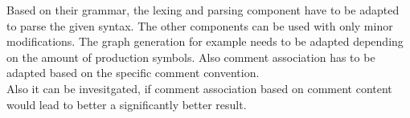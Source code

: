 Based on their grammar, the lexing and parsing component have to be adapted to parse the given syntax.
The other components can be used with only minor modifications.
The graph generation for example needs to be adapted depending on the amount of production symbols.
Also comment association has to be adapted based on the specific comment convention.\\
Also it can be invesitgated, if comment association based on comment content would lead to better a significantly better result.

